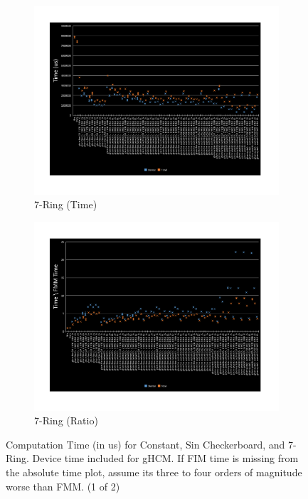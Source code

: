 \documentclass[11pt]{article}       %
\begin{document}
\begin{figure}
	\begin{subfigure}[b]{.4\columnwidth}
		\includegraphics[width=\textwidth]{Figures/time-7-ring}
		\caption{7-Ring (Time)}
	\end{subfigure}
	\begin{subfigure}[b]{.4\columnwidth}
		\includegraphics[width=\textwidth]{Figures/ratio-time-7-ring}
		\caption{7-Ring (Ratio)}
	\end{subfigure}

	\caption{Computation Time (in us) for Constant, Sin Checkerboard, and 7-Ring. Device time included for gHCM. If FIM time is missing from the absolute time plot, assume its three to four orders of magnitude worse than FMM. (1 of 2)}
	\label{fig:perf_results_main_1}
\end{figure}
\end{document}
